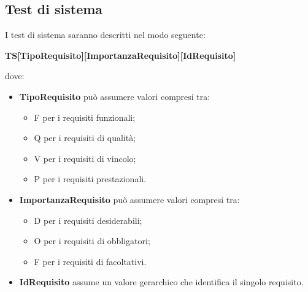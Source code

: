 \documentclass[../PianoDiQualifica.tex]{subfiles}
\begin{document}
	\subsection{Test di sistema}
	I test di sistema saranno descritti nel modo seguente:
	\begin{center}
		\textbf{TS[TipoRequisito][ImportanzaRequisito][IdRequisito]}
	\end{center}		
	dove:
	\begin{itemize}
		\item \textbf{TipoRequisito} può assumere valori compresi tra:
		\begin{itemize}
			\item F per i requisiti funzionali;
			\item Q per i requisiti di qualità;
			\item V per i requisiti di vincolo;
			\item P per i requisiti prestazionali.
		\end{itemize}
		\item \textbf{ImportanzaRequisito} può assumere valori compresi tra:
		\begin{itemize}
			\item D per i requisiti desiderabili;
			\item O per i requisiti di obbligatori;
			\item F per i requisiti di facoltativi.
		\end{itemize}
		\item \textbf{IdRequisito} assume un valore gerarchico che identifica il singolo requisito.
	\end{itemize}
	
\end{document}
